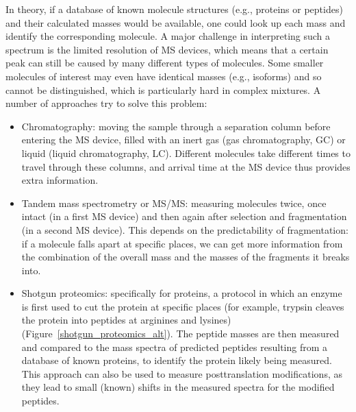 In theory, if a database of known
molecule structures (e.g., proteins or peptides) and their calculated masses
would be available, one could look up each mass and identify the
corresponding molecule. A major challenge in interpreting such a
spectrum is the limited resolution of MS devices, which means that a
certain peak can still be caused by many different types of molecules. Some
smaller molecules of interest may even have identical masses (e.g.,
isoforms) and so cannot be distinguished, which is particularly hard in
complex mixtures. A number of approaches try to solve this problem:

\begin{itemize}
\item Chromatography: moving the sample through a separation column before entering the MS
device, filled with an inert gas (gas chromatography, GC) or liquid
(liquid chromatography, LC). Different molecules take different times to travel through these
columns, and arrival time at the MS device thus provides extra information.
\item Tandem mass spectrometry or MS/MS: measuring molecules twice, once intact (in a first MS device) and then
again after selection and fragmentation (in a second MS device). This depends on the
predictability of fragmentation: if a molecule falls apart at specific
places, we can get more information from the combination of the overall mass
and the masses of the fragments it breaks into.
\item Shotgun proteomics: specifically for proteins, a protocol in which an enzyme is first used to
cut the protein at specific places (for example, trypsin cleaves the protein
into peptides at arginines and lysines) (Figure~\ref{shotgun_proteomics_alt}). The peptide masses are then
measured and compared to the mass spectra of predicted peptides resulting from a
database of known proteins, to identify the protein likely being measured.
This approach can also be used to measure posttranslation modifications,
as they lead to small (known) shifts in the measured spectra for the modified
peptides.
\end{itemize}

